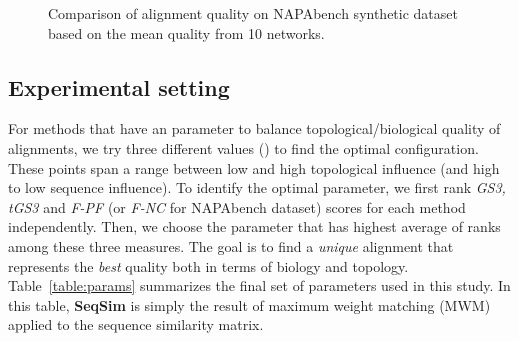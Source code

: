 \documentclass[10pt, journal, compsoc, final]{IEEEtran}
\begin{document}
\begin{figure*}[!t]
\centering
\hfil {}\hfil {}\hfil
 \hfil
 \caption{Comparison of alignment quality on NAPAbench synthetic dataset based on  the mean quality from 10 networks.}
 \label{fig:NAPA_validation}
\end{figure*}


\subsection{Experimental setting}
For methods that have an  parameter to balance topological/biological quality of alignments, we try three different values () to find the optimal configuration. These points span a range between low and high topological influence (and high to low sequence influence).  To identify the optimal parameter, we first rank \textit{GS3, tGS3} and \textit{F-PF} (or \textit{F-NC} for NAPAbench dataset) scores for each method independently. Then, we choose the parameter that has highest average of ranks among these three measures. The goal is to find a \textit{unique} alignment that represents the \textit{best} quality both in terms of biology and topology. 
Table~\ref{table:params} summarizes the final set of parameters used in this study. In this table, \textbf{SeqSim} is simply the result of maximum weight matching (MWM) applied to the sequence similarity matrix.
\end{document}
